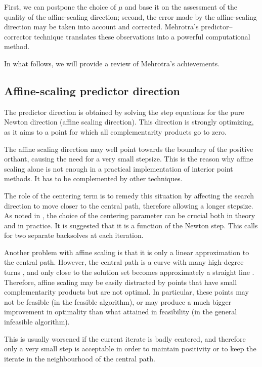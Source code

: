 First, we can postpone the choice of $\mu$ and base it
on the assessment of the quality of the affine-scaling direction;
second, the error made by the affine-scaling direction may be 
taken into account and
corrected. Mehrotra's predictor--corrector technique \cite{Mehrotra92}
translates these observations into a powerful computational method.

In what follows, we will provide a review of Mehrotra's achievements.


%
%
\subsection{Affine-scaling predictor direction}

The predictor direction is obtained by solving the step equations 
for the pure Newton direction (affine scaling direction). This 
direction is strongly optimizing, as it aims to a point for which 
all complementarity products go to zero. 

The affine scaling direction may well point towards the boundary 
of the positive orthant, causing the need for a very small stepsize. 
This is the reason why affine scaling alone is not enough in a 
practical implementation of interior point methods. It has to be 
complemented by other techniques.

The role of the centering term is to remedy this situation by 
affecting the search direction to move closer to the central path, 
therefore allowing a longer stepsize. 
As noted in \cite{TapiaZhangSaltzmanWeiser}, the choice of the 
centering parameter can be crucial both in theory and in practice. 
It is suggested that it is a function of the Newton step. 
This calls for two separate backsolves at each iteration.

Another problem with affine scaling is that it is only a linear 
approximation to the central path. However, the central path is a curve
with many high-degree turns \cite{VavasisYe}, and only close to the 
solution set becomes approximately a straight line \cite{Megiddo}. 
Therefore, affine scaling may be easily distracted by points that 
have small complementarity products but are not optimal. In particular, 
these points may not be feasible (in the feasible algorithm), or 
may produce a much bigger improvement in optimality than what 
attained in feasibility (in the general infeasible algorithm).

This is usually worsened if the current iterate is badly centered, 
and therefore only a very small step is acceptable in order to 
maintain positivity or to keep the iterate in the neighbourhood 
of the central path.

